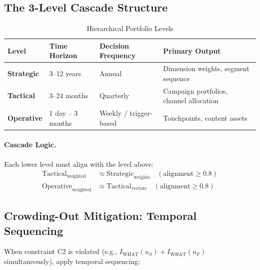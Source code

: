 \subsection{The 3-Level Cascade Structure}
\label{sec:hhh-cascade-levels}

\begin{table}[htbp]
\centering
\caption{Hierarchical Portfolio Levels}
\label{tab:cascade-levels}
\renewcommand{\arraystretch}{1.3}
\begin{tabular}{@{}llll@{}}
\toprule
\textbf{Level} & \textbf{Time Horizon} & \textbf{Decision Frequency} & \textbf{Primary Output} \\
\midrule
\textbf{Strategic} & 3--12 years & Annual & Dimension weights, segment sequence \\
\textbf{Tactical} & 3--24 months & Quarterly & Campaign portfolios, channel allocation \\
\textbf{Operative} & 1 day -- 3 months & Weekly / trigger-based & Touchpoints, content assets \\
\bottomrule
\end{tabular}
\end{table}

\paragraph{Cascade Logic.} Each lower level must align with the level above:
\begin{align}
\text{Tactical}_{\text{weighted}} &\approx \text{Strategic}_{\text{weights}} \quad (\text{alignment} \geq 0.8) \\
\text{Operative}_{\text{weighted}} &\approx \text{Tactical}_{\text{vectors}} \quad (\text{alignment} \geq 0.8)
\end{align}

\subsection{Crowding-Out Mitigation: Temporal Sequencing}
\label{sec:hhh-cascade-crowding}

When constraint C2 is violated (e.g., $I_{\text{WHAT}}(u_S) + I_{\text{WHAT}}(u_F)$ simultaneously),
apply temporal sequencing:

